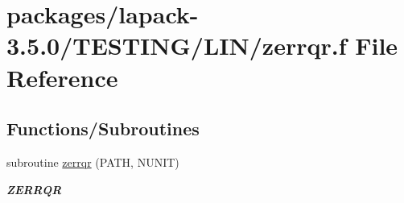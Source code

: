 \hypertarget{zerrqr_8f}{}\section{packages/lapack-\/3.5.0/\+T\+E\+S\+T\+I\+N\+G/\+L\+I\+N/zerrqr.f File Reference}
\label{zerrqr_8f}
\subsection*{Functions/\+Subroutines}
\begin{DoxyCompactItemize}
\item 
subroutine \hyperlink{group__complex16__lin_gaf583cf9e4c399f2cdb9a7e900bdf89fc}{zerrqr} (P\+A\+T\+H, N\+U\+N\+I\+T)
\begin{DoxyCompactList}\small\item\em {\bfseries Z\+E\+R\+R\+Q\+R} \end{DoxyCompactList}\end{DoxyCompactItemize}

